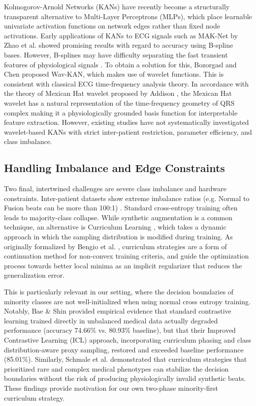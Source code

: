 \documentclass[journal]{IEEEtran}
\begin{document}
Kolmogorov-Arnold Networks (KANs) \cite{liu_kan_2024} have recently become a structurally transparent alternative to Multi-Layer Perceptrons (MLPs), which place learnable univariate activation functions on network edges rather than fixed node activations. Early applications of KANs to ECG signals such as MAK-Net by Zhao et al. \cite{zhao_mak-net_2025} showed promising results with regard to accuracy using B-spline bases. However, B-splines may have difficulty separating the fast transient features of physiological signals \cite{bozorgasl_liu_2024}. To obtain a solution for this, Bozorgasl and Chen \cite{bozorgasl_liu_2024} proposed Wav-KAN, which makes use of wavelet functions. This is consistent with classical ECG time-frequency analysis theory. In accordance with the theory of Mexican Hat wavelet proposed by Addison \cite{addison_wavelet_2005}, the Mexican Hat wavelet has a natural representation of the time-frequency geometry of QRS complex making it a physiologically grounded basis function for interpretable feature extraction. However, existing studies have not systematically investigated wavelet-based KANs with strict inter-patient restriction, parameter efficiency, and class imbalance.

\subsection{Handling Imbalance and Edge Constraints}
Two final, intertwined challenges are severe class imbalance and hardware constraints. Inter-patient datasets show extreme imbalance ratios (e.g. Normal to Fusion beats can be more than 100:1) \cite{silva_systematic_2025}. Standard cross-entropy training often leads to majority-class collapse. While synthetic augmentation is a common technique, an alternative is Curriculum Learning \cite{bengio_curriculum_2009}, which takes a dynamic approach in which the sampling distribution is modified during training. As originally formalized by Bengio et al. \cite{bengio_curriculum_2009}, curriculum strategies are a form of continuation method for non-convex training criteria, and guide the optimization process towards better local minima as an implicit regularizer that reduces the generalization error.

This is particularly relevant in our setting, where the decision boundaries of minority classes are not well-initialized when using normal cross entropy training. Notably, Bae \& Shin \cite{bae_handling_2025} provided empirical evidence that standard contrastive learning trained directly in unbalanced medical data actually degraded performance (accuracy 74.66\% vs. 80.93\% baseline), but that their Improved Contrastive Learning (ICL) approach, incorporating curriculum phasing and class distribution-aware proxy sampling, restored and exceeded baseline performance (85.01\%). Similarly, Schmale et al. \cite{schmale_curriculum_2025} demonstrated that curriculum strategies that prioritized rare and complex medical phenotypes can stabilize the decision boundaries without the risk of producing physiologically invalid synthetic beats. These findings provide motivation for our own two-phase minority-first curriculum strategy.
\end{document}
